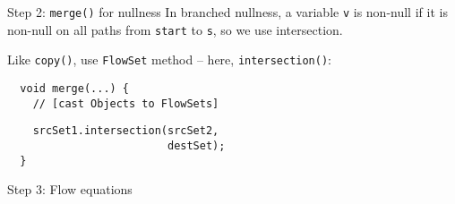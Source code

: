 \begin{slide}{Step 2: {\tt merge()} for nullness}
In branched nullness, a variable {\tt v} is non-null if it is non-null
on all paths from {\tt start} to {\tt s}, so we use intersection.

\qquad

Like {\tt copy()}, use {\tt FlowSet} method -- here, {\tt intersection()}:

\vspace*{0.05in}

\begin{verbatim}
  void merge(...) {
    // [cast Objects to FlowSets]
\end{verbatim}
{\red\verb+    srcSet1.intersection(srcSet2,+\\
     \verb+                         destSet);+}\\
\verb+  }+

\end{slide}


\begin{slide}{Step 3: Flow equations}
\vspace*{-0.1in}

\end{slide}








